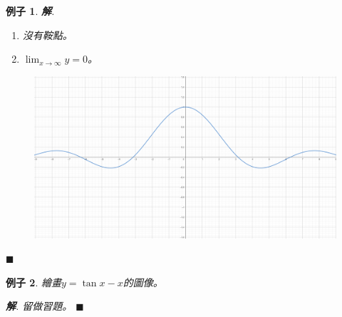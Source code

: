 \documentclass[12pt]{article}
\newtheorem*{example}{例子}
\newenvironment*{sol}{\par \textbf{解}.}{\hfill$\blacksquare$}
\begin{document}
\begin{example}
\begin{sol}
\begin{enumerate}
                $y''=\displaystyle\frac{(2-x^2)\sin{x}}{x^3}$。則可檢查
                \begin{center}
                    \begin{tabular}{|c|c|c|c|c|c|c|c|}
                        \hline
                        $x$&$\cdots$&$-7.25$&$-4.49$&$0$&$4.49$&$7.25$&$\cdots$\\
                        \hline
                        $y''$&$\cdots$&$-$&$+$&$\lim_{x\to 0}y''<0$&$+$&$-$&$\cdots$\\
                        \hline
                    \end{tabular}
                \end{center}
                \item 沒有鞍點。
                \item $\displaystyle\lim_{x\to\infty}y=0$。
            \end{enumerate}
            \begin{figure}[H]
                \centering
                \includegraphics[scale=0.3]{Si(x).png}
            \end{figure}
        \end{sol}
    \end{example}

    \begin{example}
        繪畫$y=\tan{x}-x$的圖像。
        \begin{sol}
            留做習題。
        \end{sol}
    \end{example}
\end{document}
